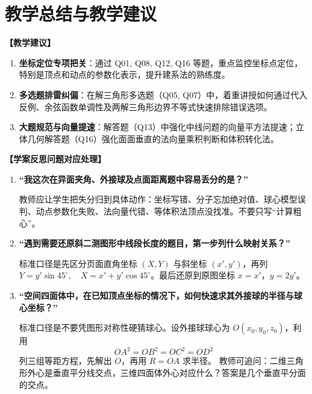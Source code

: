 \documentclass[11pt,a4paper]{ctexart}
\begin{document}
\par\vspace{0.8em}

\section{教学总结与教学建议}

\textbf{【教学建议】}
\begin{enumerate}[label=\arabic*. , leftmargin=2em, itemsep=0.6em]
  \item \textbf{坐标定位专项把关}：通过 Q01, Q08, Q12, Q16 等题，重点监控坐标点定位，特别是顶点和动点的参数化表示，提升建系法的熟练度。
  \item \textbf{多选题排雷纠偏}：在解三角形多选题（Q05, Q07）中，着重讲授如何通过代入反例、余弦函数单调性及两解三角形边界不等式快速排除错误选项。
  \item \textbf{大题规范与向量提速}：解答题（Q13）中强化中线问题的向量平方法提速；立体几何解答题（Q16）强化面面垂直的法向量乘积判断和体积转化法。
\end{enumerate}

\textbf{【学案反思问题对应处理】}
\begin{enumerate}[label=\arabic*. , leftmargin=2em, itemsep=0.7em]
  \item \textbf{“我这次在异面夹角、外接球及点面距离题中容易丢分的是？”}
  
  教师应让学生把失分归到具体动作：坐标写错、分子忘加绝对值、球心模型误判、动点参数化失败、法向量代错、等体积法顶点没找准。不要只写“计算粗心”。
  
  \item \textbf{“遇到需要还原斜二测图形中线段长度的题目，第一步列什么映射关系？”}
  
  标准口径是先区分页面直角坐标 \((X,Y)\) 与斜坐标 \((x',y')\)，再列 \( Y=y'\sin45^\circ,\quad X=x'+y'\cos45^\circ \)。最后还原到原图坐标 \(x=x'\)，\(y=2y'\)。
  
  \item \textbf{“空间四面体中，在已知顶点坐标的情况下，如何快速求其外接球的半径与球心坐标？”}
  
  标准口径是不要凭图形对称性硬猜球心。设外接球球心为 \(O(x_0,y_0,z_0)\)，利用
  \[
    OA^2=OB^2=OC^2=OD^2
  \]
  列三组等距方程，先解出 \(O\)，再用 \(R=OA\) 求半径。
  教师可追问：二维三角形外心是垂直平分线交点，三维四面体外心对应什么？答案是几个垂直平分面的交点。
\end{enumerate}
\end{document}
